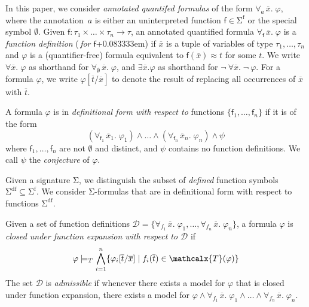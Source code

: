 \documentclass[runningheads,a4paper]{llncs}
\newcommand{\con}[1]{\mathsf{#1}}
\renewcommand\vec[1]{\overline{#1}}
\let\oldSigma=\Sigma
\def\Sigma{\mathrm{\oldSigma}}
\let\oldneg=\neg
\def\neg{\oldneg\:}
\let\oldwedge=\wedge
\def\wedge{\mathrel{\oldwedge}}
\newcommand{\teq}{\approx}
\newcommand{\terms}{\mathcalx{T}}
\newcommand{\sfuns}[1]{#1^\mathrm{f}}
\newcommand{\sfundefs}[1]{#1^\mathrm{df}}
\newcommand{\forallf}[1]{\forall_{\!#1\:}}
\newcommand{\fnull}{\emptyset}
\newcommand{\rem}[1]{\textcolor{red}{[#1]}}
\newcommand{\ct}[1]{\rem{#1 --ct}}
\newcommand{\vthinspace}{\kern+0.083333em}
\begin{document}
In this paper, we consider \emph{annotated quantifed formulas} of the form
$\forallf{a} \vec x.\; \varphi$, where the annotation~$a$ is either
an uninterpreted function $\con{f} \in \sfuns{\Sigma}$ or the special symbol
$\fnull$.
Given $\con{f} : \tau_1 \times \ldots \times \tau_n \rightarrow \tau$,
an annotated
quantified formula $\forallf{\con{f}} \vec x.\; \varphi$ is a \emph{function definition}
(\,\emph{for $\con{f}$}\vthinspace) if $\vec x$ is a tuple of variables of type
$\tau_1, \ldots, \tau_n$ and $\varphi$ is a (quantifier-free) formula equivalent to
$\con{f}( \vec x ) \teq t$ for some $t$. We write $\forall \vec
x.\; \varphi$ as shorthand for $\forallf{\fnull} \vec x.\; \varphi$, and $\exists
\vec x. \varphi$ as shorthand for $\neg \forall \vec x.\; \neg \varphi$.
For a formula $\varphi$, 
we write $\varphi[\vec t/\vec x]$ to denote the result of replacing all occurrences of $\vec x$ with $\vec t$.

\begin{definition}%
\rm
A formula $\varphi$ is in \emph{definitional form with respect to} functions $\{
\con{f}_1, \ldots, \con{f}_n \}$ if it is of the form
%
%
\begin{equation} \label{eq:wdf}
(\forallf{\con{f}_1} \vec x_1.\; \varphi_1) \wedge \ldots \wedge (\forallf{\con{f}_n} \vec x_n.\; \varphi_n) \wedge \psi
\end{equation}
%
where $\con{f}_1, \ldots, \con{f}_n$ are not $\fnull$ and distinct, 
and $\psi$ contains no function definitions.
We call $\psi$ the \emph{conjecture} of $\varphi$.
\end{definition}

Given a signature $\Sigma$,
we distinguish the subset of \emph{defined} function symbols $\sfundefs{\Sigma}
\subseteq \sfuns{\Sigma}$.
We consider $\Sigma$-formulas that are in definitional form with respect to
functions $\sfundefs{\Sigma}$.

\begin{definition}
Given a set of function definitions $\mathcal{D} = \{ \forallf{f_1} \vec x.\; \varphi_1, \ldots, \forallf{f_n} \vec x.\; \varphi_n \}$,
a formula $\varphi$ is \emph{closed under function expansion with respect to $\mathcal{D}$} if
\begin{eqnarray}
\varphi \models_T \displaystyle\bigwedge\limits_{i=1}^n \{ \varphi_i[ \vec t / \vec x ] \mid f_i( \vec t ) \in \terms( \varphi ) \}
\end{eqnarray}
The set $\mathcal{D}$ is \emph{admissible} if whenever there exists a model for $\varphi$ that is closed under function expansion,
there exists a model for $\varphi \wedge \forallf{f_1} \vec x.\; \varphi_1 \wedge \ldots \wedge \forallf{f_n} \vec x.\; \varphi_n$.
\end{definition}
\end{document}
